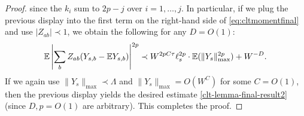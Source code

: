 \begin{proof}
{%
since the $k_{i}$ sum to $2p-j$ over $i=1,\ldots,j$. In particular, if we plug the previous display into the first term on the right-hand side of \eqref{eq:cltmomentfinal} and use $|Z_{ab}|\prec1$, we obtain the following for any $D=O(1)$:
%
\begin{align*}
\mathbb{E}\left|\sum_{b}Z_{ab}(Y_{s,b}-\mathbb{E} Y_{s,b})\right|^{2p}\prec W^{2pC\tau}\ell_{s}^{2p}\cdot \mathbb{E}(\|Y_{s}\|_{\max}^{2p})+W^{-D}.
\end{align*}
%
If we again use $\|Y_{s}\|_{\max}\prec \Lambda$ and $\|Y_{s}\|_{\max}=O(W^{C})$ for some $C=O(1)$, then the previous display yields the desired estimate \eqref{clt-lemma-final-result2} (since $D,p=O(1)$ are arbitrary). This completes the proof.}
\end{proof}



